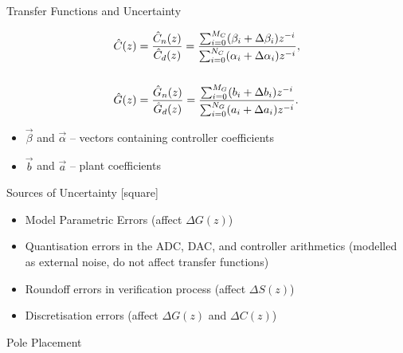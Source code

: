 \documentclass{beamer}
\begin{document}
\begin{frame}{Transfer Functions and Uncertainty}

\begin{align*}
\small
\hat{C}(z)&=\frac{\hat{C}_n(z)}{\hat{C}_d(z)}=\frac{\sum_{i=0}^{M_C}(\beta_{i}+\Delta\beta_{i}) z^{-i}}{\sum_{i=0}^{N_C}(\alpha_{i}+\Delta \alpha_{i}) z^{-i}}, \\
\\%
\hat{G}(z)&=\frac{\hat{G}_n(z)}{\hat{G}_d(z)}=\frac{\sum_{i=0}^{M_G}(b_{i}+\Delta b_i) z^{-i}}{\sum_{i=0}^{N_G}(a_{i}+\Delta a_{i}) z^{-i}}.
\end{align*}
%
\begin{itemize}
\item 
$\vec{\beta}$ and $\vec{\alpha}$ -- vectors containing controller coefficients 
\item 
$\vec{b}$ and $\vec{a}$ -- plant coefficients 
\end{itemize}

\end{frame}

\begin{frame}{Sources of Uncertainty}
[square]

\begin{itemize}
\item<1->[1.] Model Parametric Errors (affect $\Delta G(z)$)
\item<2->[2.] Quantisation errors in the ADC, DAC, and controller arithmetics  
(modelled as external noise, do not affect transfer functions)
\item<3->[3.] Roundoff errors in verification process (affect $\Delta S(z)$)
\item<4->[4.] Discretisation errors (affect $\Delta G(z)$ and $\Delta C(z)$) 
\end{itemize}
\end{frame}

\begin{frame}[fragile]{Pole Placement}


\begin{figure}
\centering
{}
\end{figure}
\end{frame}
\end{document}

